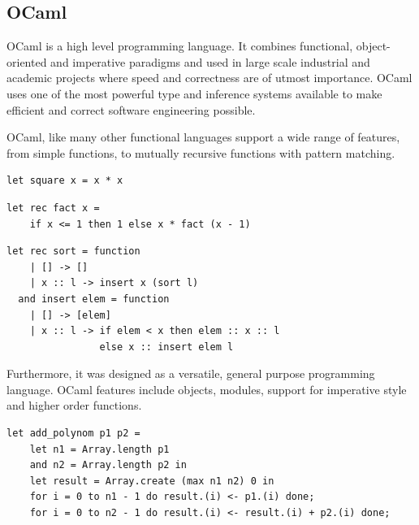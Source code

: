 \documentclass[12pt,twoside,notitlepage]{report}
\begin{document}
\subsection{OCaml}
OCaml is a high level programming language. It combines functional, object-oriented and imperative paradigms and used in large scale industrial and academic projects where speed and correctness are of utmost importance. OCaml uses one of the most powerful type and inference systems available to make efficient and correct software engineering possible.

OCaml, like many other functional languages support a wide range of features, from simple functions, to mutually recursive functions with pattern matching.
\begin{minipage}{\linewidth}

\begin{lstlisting}[caption={OCaml simple function example: square}]
let square x = x * x
\end{lstlisting}

\end{minipage}



\begin{minipage}{\linewidth}

\begin{lstlisting}[caption={OCaml recursive function example: factorial}]
let rec fact x =
    if x <= 1 then 1 else x * fact (x - 1)
\end{lstlisting}

\end{minipage}

\begin{minipage}{\linewidth}

\begin{lstlisting}[caption={OCaml complex function example: insertion sort}]
let rec sort = function
    | [] -> []
    | x :: l -> insert x (sort l)
  and insert elem = function
    | [] -> [elem]
    | x :: l -> if elem < x then elem :: x :: l
                else x :: insert elem l
\end{lstlisting}

\end{minipage}

Furthermore, it was designed as a versatile, general purpose programming language. OCaml features include objects, modules, support for imperative style and higher order functions.

\begin{minipage}{\linewidth}

\begin{lstlisting}[caption={OCaml imperative function example}]
let add_polynom p1 p2 =
    let n1 = Array.length p1
    and n2 = Array.length p2 in
    let result = Array.create (max n1 n2) 0 in
    for i = 0 to n1 - 1 do result.(i) <- p1.(i) done;
    for i = 0 to n2 - 1 do result.(i) <- result.(i) + p2.(i) done;
\end{lstlisting}

\end{minipage}
\end{document}
